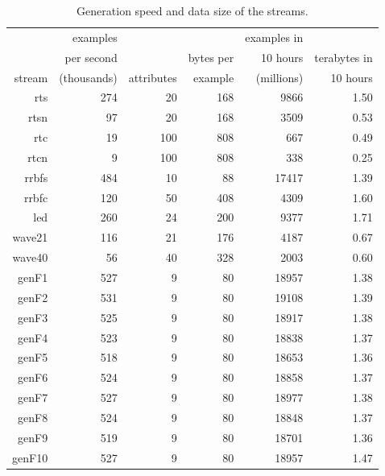 \begin{table}
\caption{Generation speed and data size of the streams.}
\centering
\begin{tabular}{|r|r|r|r|r|r|}
\hline		
	&	examples	&		&		&	examples in	&		\\
	&	per second	&		&	bytes per	&	10 hours	&	terabytes in	\\
stream	&	(thousands)	&	attributes	&	example	&	(millions)	&	10 hours	\\
\hline											
{\sc rts}	&	274	&	20	&	168	&	9866	&	1.50	\\
{\sc rtsn}	&	97	&	20	&	168	&	3509	&	0.53	\\
{\sc rtc	}&	19	&	100	&	808	&	667	&	0.49	\\
{\sc rtcn}	&	9	&	100	&	808	&	338	&	0.25	\\
{\sc rrbfs}	&	484	&	10	&	88	&	17417	&	1.39	\\
{\sc rrbfc}	&	120	&	50	&	408	&	4309	&	1.60	\\
{\sc led	}&	260	&	24	&	200	&	9377	&	1.71	\\
{\sc wave21}	&	116	&	21	&	176	&	4187	&	0.67	\\
{\sc wave40}	&	56	&	40	&	328	&	2003	&	0.60	\\
{\sc genF1}	&	527	&	9	&	80	&	18957	&	1.38	\\
{\sc genF2}	&	531	&	9	&	80	&	19108	&	1.39	\\
{\sc genF3}	&	525	&	9	&	80	&	18917	&	1.38	\\
{\sc genF4}	&	523	&	9	&	80	&	18838	&	1.37	\\
{\sc genF5}	&	518	&	9	&	80	&	18653	&	1.36	\\
{\sc genF6}	&	524	&	9	&	80	&	18858	&	1.37	\\
{\sc genF7}	&	527	&	9	&	80	&	18977	&	1.38	\\
{\sc genF8}	&	524	&	9	&	80	&	18848	&	1.37	\\
{\sc genF9}	&	519	&	9	&	80	&	18701	&	1.36	\\
{\sc genF10}	&	527	&	9	&	80	&	18957	&	1.47	\\
\hline											
\end{tabular}
\label{tab:dsspeeds}
\end{table}


